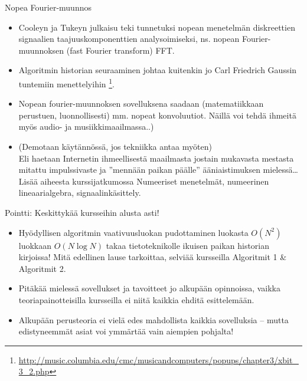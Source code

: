 \documentclass[pdf,10pt,handout]{beamer}
\begin{document}
\begin{frame}{Nopea Fourier-muunnos}
\begin{itemize}
\item
  Cooleyn ja Tukeyn julkaisu \cite{CooleyTukey1965fft} teki tunnetuksi
  nopean menetelmän diskreettien signaalien taajuuskomponenttien
  analysoimiseksi, ns. nopean Fourier-muunnoksen (fast Fourier transform)
  FFT.
\item
  Algoritmin historian seuraaminen johtaa kuitenkin jo Carl
  Friedrich Gaussin tuntemiin menettelyihin
  \footnote{\url{http://music.columbia.edu/cmc/musicandcomputers/popups/chapter3/xbit_3_2.php}}.
\item
  Nopean fourier-muunnoksen sovelluksena saadaan (matematiikkaan
  perustuen, luonnollisesti) mm. nopeat konvoluutiot. Näillä voi tehdä
  ihmeitä myös audio- ja musiikkimaailmassa..)
\item[] (Demotaan käytännössä, jos tekniikka antaa myöten)\\ Eli
  haetaan Internetin ihmeellisestä maailmasta jostain mukavasta
  mestasta mitattu impulssivaste ja ''mennään paikan päälle'' ääniaistimuksen
  mielessä\ldots Lisää aiheesta kurssijatkumossa Numeeriset
  menetelmät, numeerinen lineaarialgebra, signaalinkäsittely.
\end{itemize}
\end{frame}


\begin{frame}{Pointti: Keskittykää kursseihin alusta asti!}
\begin{itemize}
\item
  Hyödyllisen algoritmin vaativuusluokan pudottaminen luokasta
  $O(N^2)$ luokkaan $O(N \mathop{log} N)$ takaa tietoteknikolle
  ikuisen paikan historian kirjoissa! Mitä edellinen lause tarkoittaa,
  selviää kursseilla Algoritmit 1 \& Algoritmit 2.
\item
  Pitäkää mielessä sovellukset ja tavoitteet jo alkupään opinnoissa,
  vaikka teoriapainotteisilla kursseilla ei niitä kaikkia ehditä
  esittelemään.
\item Alkupään perusteoria ei vielä edes mahdollista kaikkia
  sovelluksia -- mutta edistyneemmät asiat voi ymmärtää vain aiempien
  pohjalta!
\end{itemize}
\end{frame}
\end{document}
